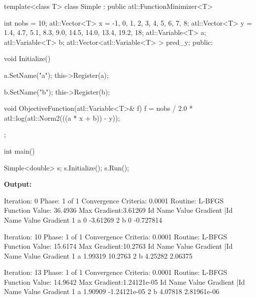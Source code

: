 \documentclass[12pt,a4paper]{article}
\begin{document}
\begin{cppsource}
template<class T>
class Simple : public atl::FunctionMinimizer<T> {
    int nobs = 10;
    atl::Vector<T> x = {-1, 0, 1, 2, 3, 4, 5, 6, 7, 8};
    atl::Vector<T> y = {1.4, 4.7, 5.1, 8.3, 9.0, 14.5, 14.0, 13.4, 19.2, 18};
    atl::Variable<T> a;
    atl::Variable<T> b;
    atl::Vector<atl::Variable<T> > pred_y;
public:

    void Initialize() {
    
        a.SetName("a");
        this->Register(a);

        b.SetName("b");
        this->Register(b);

    }

    void ObjectiveFunction(atl::Variable<T>& f) {
        f = nobs / 2.0 * atl::log(atl::Norm2(((a * x + b)) - y));
    }


};

int main() {

    Simple<double> s;
    s.Initialize();
    s.Run();
}    
\end{cppsource}

\textbf{Output:}

\begin{myoutput}
Iteration: 0
Phase: 1 of 1
Convergence Criteria: 0.0001
Routine: L-BFGS
Function Value: 36.4936
Max Gradient:3.61269
Id      Name      Value          Gradient       |Id      Name      Value          Gradient       
1       a         0              -3.61269       2       b         0              -0.727814      

Iteration: 10
Phase: 1 of 1
Convergence Criteria: 0.0001
Routine: L-BFGS
Function Value: 15.6174
Max Gradient:10.2763
Id      Name      Value          Gradient       |Id      Name      Value          Gradient       
1       a         1.99319        10.2763        2       b         4.25282        2.06375        

Iteration: 13
Phase: 1 of 1
Convergence Criteria: 0.0001
Routine: L-BFGS
Function Value: 14.9642
Max Gradient:1.24121e-05
Id      Name      Value          Gradient       |Id      Name      Value          Gradient       
1       a         1.90909        -1.24121e-05   2       b         4.07818        2.81961e-06    


\end{myoutput}
\end{document}
